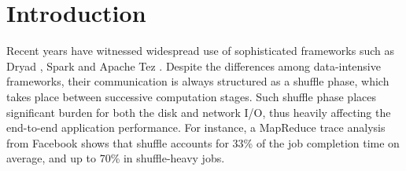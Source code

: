 \section{Introduction}
Recent years have witnessed widespread use of sophisticated frameworks such as Dryad \cite{dryad}, Spark \cite{spark} and Apache Tez \cite{tez}.
Despite the differences among data-intensive frameworks, their communication is always structured as a shuffle phase,  which takes place between successive computation stages. Such shuffle phase places significant burden for both the disk and network I/O, thus heavily affecting the end-to-end application performance. For instance, a MapReduce trace analysis from Facebook shows that shuffle accounts for 33\% of the job completion time on average, and up to 70\% in shuffle-heavy jobs\cite{managing}.

